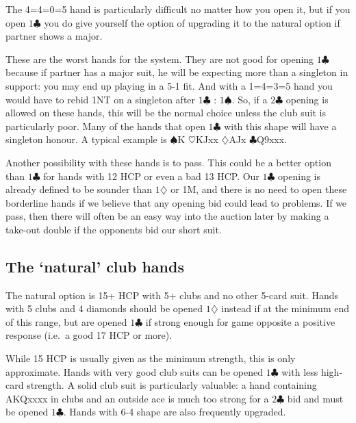 \documentclass{article}
\newcommand{\sz}{\spadesuit}
\newcommand{\hz}{\heartsuit}
\newcommand{\dz}{\diamondsuit}
\newcommand{\cz}{\clubsuit}
\begin{document}
\begin{description}
The 4=4=0=5 hand is particularly difficult no matter how you open it, but if you open $1\cz$ you do give yourself the option of upgrading it to the natural option if partner shows a major.

\item[4=1=3=5 or 1=4=3=5] These are the worst hands for the system. They are not good for opening $1\cz$ because if partner has a major suit, he will be expecting more than a singleton in support: you may end up playing in a 5-1 fit. And with a 1=4=3=5 hand you would have to rebid 1NT on a singleton after $1\cz$ : $1\sz$. So, if a $2\cz$ opening is allowed on these hands, this will be the normal choice unless the club suit is particularly poor. Many of the hands that open $1\cz$ with this shape will have a singleton honour. A typical example is $\sz$K $\hz$KJxx $\dz$AJx $\cz$Q9xxx.

Another possibility with these hands is to pass. This could be a better option than $1\cz$ for hands with 12 HCP or even a bad 13 HCP. Our $1\cz$ opening is already defined to be sounder than $1\dz$ or 1M, and there is no need to open these borderline hands if we believe that any opening bid could lead to problems. If we pass, then there will often be an easy way into the auction later by making a take-out double if the opponents bid our short suit.

\end{description}

\subsection{The `natural' club hands}

The natural option is 15+ HCP with 5+ clubs and no other 5-card suit. Hands with 5 clubs and 4 diamonds should be opened $1\dz$ instead if at the minimum end of this range, but are opened $1\cz$ if strong enough for game opposite a positive response (i.e.~a good 17 HCP or more).

While 15 HCP is usually given as the minimum strength, this is only approximate. Hands with very good club suits can be opened $1\cz$ with less high-card strength. A solid club suit is particularly valuable: a hand containing AKQxxxx in clubs and an outside ace is much too strong for a $2\cz$ bid and must be opened $1\cz$. Hands with 6-4 shape are also frequently upgraded.
\end{document}
